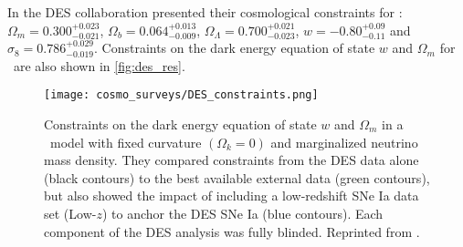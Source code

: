 In \textcite{2019PhRvL.122q1301A} the DES collaboration presented their cosmological constraints for \wCDM: $\Omega_m=0.300^{+0.023}_{-0.021}$, $\Omega_b=0.064^{+0.013}_{-0.009}$, $\Omega_\Lambda=0.700^{+0.021}_{-0.023}$, $w=-0.80^{+0.09}_{-0.11}$ and $\sigma_8=0.786^{+0.029}_{-0.019}$. Constraints on the dark energy equation of state $w$ and $\Omega_m$ for \wCDM\ are also shown in \autoref{fig:des_res}.

\begin{figure}[htb]
    \centering
    \texttt{[image: cosmo\_surveys/DES\_constraints.png]}
    \caption{Constraints on the dark energy equation of state $w$ and $\Omega_m$ in a \wCDM\ model with fixed curvature $(\Omega_k=0)$ and marginalized neutrino mass density. They compared constraints from the DES data alone (black contours) to the best available external data (green contours), but also showed the impact of including a low-redshift SNe Ia data set (Low-$z$) to anchor the DES SNe Ia (blue contours). Each component of the DES analysis was fully blinded. Reprinted from \textcite{2019PhRvL.122q1301A}.}
    \label{fig:des_res}
\end{figure}
